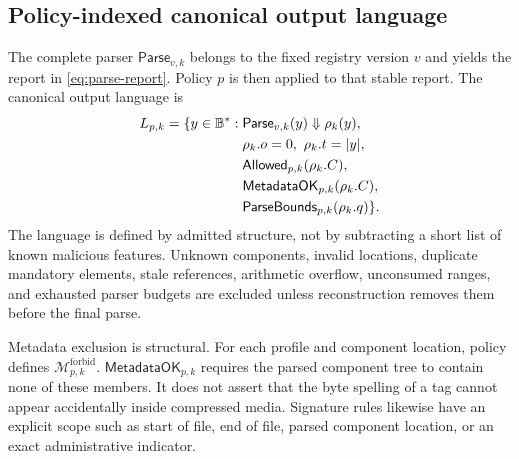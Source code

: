 \subsection{Policy-indexed canonical output language}

The complete parser $\mathsf{Parse}_{v,k}$ belongs to the fixed registry version
$v$ and yields the report in \cref{eq:parse-report}. Policy $p$ is then applied
to that stable report. The canonical output language is
\begin{align}
  L_{p,k}=\{y\in\mathbb{B}^{*}:{}&
  \mathsf{Parse}_{v,k}(y)\Downarrow\rho_k(y),\notag\\
  &\rho_k.o=0,\ \rho_k.t=|y|,\notag\\
  &\mathsf{Allowed}_{p,k}(\rho_k.C),\notag\\
  &\mathsf{MetadataOK}_{p,k}(\rho_k.C),\notag\\
  &\mathsf{ParseBounds}_{p,k}(\rho_k.q)\}.
  \label{eq:canonical-language}
\end{align}
The language is defined by admitted structure, not by subtracting a short list
of known malicious features. Unknown components, invalid locations, duplicate
mandatory elements, stale references, arithmetic overflow, unconsumed ranges,
and exhausted parser budgets are excluded unless reconstruction removes them
before the final parse.

Metadata exclusion is structural. For each profile and component location,
policy defines $\mathcal{M}^{\mathrm{forbid}}_{p,k}$.
$\mathsf{MetadataOK}_{p,k}$ requires the parsed component tree to contain none
of these members. It does not assert that the byte spelling of a tag cannot
appear accidentally inside compressed media. Signature rules likewise have an
explicit scope such as start of file, end of file, parsed component location,
or an exact administrative indicator.

